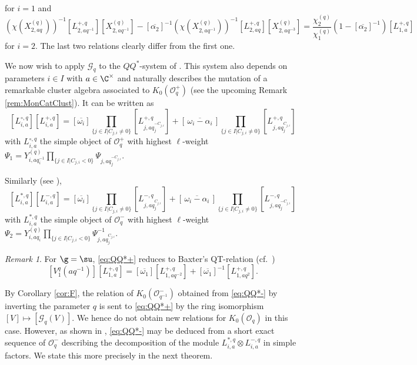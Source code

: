 \documentclass[11pt]{amsart}
\theoremstyle{definition}
\theoremstyle{remark}
\newtheorem{rem}[theorem]{Remark}
\numberwithin{equation}{section}
\begin{document}
for $i=1$ and 
$$ (\chi(X_{2,aq}^{(q)}))^{-1}[L_{2,aq^{-1}}^{+,q}][X_{2,aq^{-1}}^{(q)}] - [\overline{\alpha_2}]^{-1}(\chi(X_{2,aq^{-1}}^{(q)}))^{-1}[L_{2,aq}^{+,q}][X_{2,aq^{-3}}^{(q)}]=\textstyle\frac{\chi_2^{(q)}}{\chi_1^{(q)}}(1-[\overline{\alpha_2}]^{-1})[L_{1,a}^{+,q}]$$ 
for $i=2$. The last two relations clearly differ from the first one.\par
We now wish to apply $\mathcal{G}_q$ to the $QQ^*$-system of \cite[Section 6]{hl2}. This system also depends on parameters $i\in I$ with $a\in \C^{\times}$ and naturally describes the mutation of a remarkable 
cluster algebra associated to $K_0(\mathcal{O}_q^+)$ (see the upcoming Remark \ref{rem:MonCatClust}). It can be written as
\begin{equation}\label{eq:QQ*+}
[L_{i,a}^{\circ,q}][L_{i,a}^{+,q}] = [\overline{\omega_i}]\prod_{\{j\in I|C_{j,i}\neq 0\}}[L_{j,aq_j^{-C_{j,i}}}^{+,q}]+[\,\overline{\omega_i-\alpha_i}\,]\prod_{\{j\in I|C_{j,i}\neq 0\}}[L^{+,q}_{j,aq_j^{C_{j,i}}}]
\end{equation}
with $L_{i,a}^{\circ,q}$ the simple object of $\mathcal{O}_q^+$ with highest $\ell$-weight $\Psi_1 =Y_{i,aq_i^{-1}}^{(q)} \prod_{\{j\in I|C_{j,i}<0\}} \Psi_{j,aq_j^{-C_{j,i}}}.$ \par Similarly (see \cite[Section 7]{hl2}),
\begin{equation}\label{eq:QQ*-}
[L_{i,a}^{*,q}][L_{i,a}^{-,q}] = [\overline{\omega_i}]\prod_{\{j\in I|C_{j,i}\neq 0\}}[L_{j,aq_j^{C_{j,i}}}^{-,q}]+[\,\overline{\omega_i-\alpha_i}\,]\prod_{\{j\in I|C_{j,i}\neq 0\}}[L^{-,q}_{j,aq_j^{-C_{j,i}}}]
\end{equation}
with $L_{i,a}^{*,q}$ the simple object of $\mathcal{O}_q^-$ with highest $\ell$-weight $\Psi_2 =Y_{i,aq_i}^{(q)}\prod_{\{j\in I|C_{j,i}<0\}} \Psi_{j,aq_j^{C_{j,i}}}^{-1}.$
\begin{rem} For $\g = \su$, \eqref{eq:QQ*+} reduces to Baxter's QT-relation (cf.~\cite{fh1})
$$[V_1^q(aq^{-1})][L_{1,a}^{+,q}]=[\overline{\omega_1}][L_{1,aq^{-2}}^{+,q}]+[\overline{\omega_1}]^{-1}[L_{1,aq^2}^{+,q}].$$
\end{rem}
By Corollary \ref{cor:F}, the relation of $K_0(\mathcal{O}_{q^{-1}}^-)$ obtained from \eqref{eq:QQ*-} by inverting the parameter $q$ is sent to \eqref{eq:QQ*+} by the ring isomorphism $[V]\mapsto[\mathcal{G}_q(V)]$. We hence do not obtain new relations for $K_0(\mathcal{O}_q)$ in this case. However, as shown in \cite{her}, \eqref{eq:QQ*-} may be deduced from a short exact sequence of $\mathcal{O}_q^-$ describing the decomposition of the module $L_{i,a}^{*,q} \otimes L_{i,a}^{-,q}$ in simple factors. We state this more precisely in the next theorem.
\end{document}
